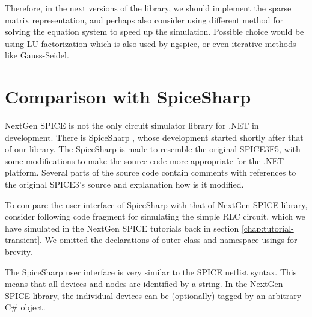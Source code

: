 Therefore, in the next versions of the library, we should implement the sparse matrix representation, and perhaps also consider using different method for solving the equation system to speed up the simulation. Possible choice would be using LU factorization which is also used by ngspice, or even iterative methods like Gauss-Seidel.

\section{Comparison with SpiceSharp}

NextGen SPICE is not the only circuit simulator library for .NET in development. There is SpiceSharp \cite{spicesharp}, whose development started shortly after that of our library. The SpiceSharp is made to resemble the original SPICE3F5, with some modifications to make the source code more appropriate for the .NET platform. Several parts of the source code contain comments with references to the original SPICE3's source and explanation how is it modified.

To compare the user interface of SpiceSharp with that of NextGen SPICE library, consider following code fragment for simulating the simple RLC circuit, which we have simulated in the NextGen SPICE tutorials back in section \ref{chap:tutorial-transient}. We omitted the declarations of outer class and namespace usings for brevity.


The SpiceSharp user interface is very similar to the SPICE netlist syntax. This means that all devices and nodes are identified by a string. In the NextGen SPICE library, the individual devices can be (optionally) tagged by an arbitrary C\# object.

